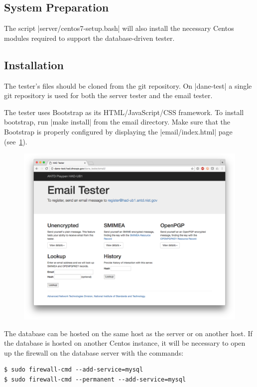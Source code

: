 \documentclass[preprint,3p]{elsarticle}
\begin{document}
\subsection{System Preparation}
The script |server/centos7-setup.bash| will also install the necessary
Centos modules required to support the database-driven tester.

\subsection{Installation}
The tester's files should be cloned from the git repository. On
|dane-test| a single git repository is used for both the server tester
and the email tester.

The tester uses Bootstrap as its HTML/JavaScript/CSS framework. To
install bootstrap, run |make install| from the email directory. Make
sure that the Bootstrap is properly configured by displaying the
|email/index.html| page (see~\ref{email-home}).

\begin{figure}
\begin{center}
\includegraphics[width=6in]{email-home}
\end{center}
\caption{}\label{email-home}
\end{figure}

The database can be hosted on the same host as the server or on
another host. If the database is hosted on another Centos instance,
it will be necessary to open up the firewall on the database server
with the commands:

\begin{Verbatim}
$ sudo firewall-cmd --add-service=mysql
$ sudo firewall-cmd --permanent --add-service=mysql
\end{Verbatim}
\end{document}
